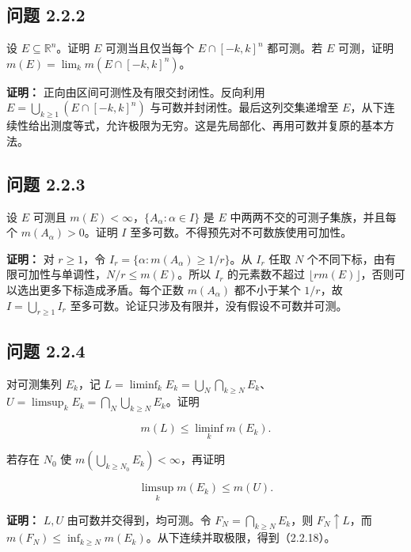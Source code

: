 \documentclass[11pt,a4paper]{article}
\begin{document}
\subsection{问题 2.2.2}\label{ux95eeux9898-2.2.2}

设 \(E\subseteq\mathbb R^n\)。证明 \(E\) 可测当且仅当每个
\(E\cap[-k,k]^n\) 都可测。若 \(E\) 可测，证明
\(m(E)=\lim_km(E\cap[-k,k]^n)\)。

\textbf{证明：} 正向由区间可测性及有限交封闭性。反向利用
\(E=\bigcup_{k\ge1}(E\cap[-k,k]^n)\) 与可数并封闭性。最后这列交集递增至
\(E\)，从下连续性给出测度等式，允许极限为无穷。这是先局部化、再用可数并复原的基本方法。

\subsection{问题 2.2.3}\label{ux95eeux9898-2.2.3}

设 \(E\) 可测且 \(m(E)<\infty\)，\(\{A_\alpha:\alpha\in I\}\) 是 \(E\)
中两两不交的可测子集族，并且每个 \(m(A_\alpha)>0\)。证明 \(I\)
至多可数。不得预先对不可数族使用可加性。

\textbf{证明：} 对 \(r\ge1\)，令
\(I_r=\{\alpha:m(A_\alpha)\ge1/r\}\)。从 \(I_r\) 任取 \(N\)
个不同下标，由有限可加性与单调性，\(N/r\le m(E)\)。所以 \(I_r\)
的元素数不超过
\(\lfloor r m(E)\rfloor\)，否则可以选出更多下标造成矛盾。每个正数
\(m(A_\alpha)\) 都不小于某个 \(1/r\)，故 \(I=\bigcup_{r\ge1}I_r\)
至多可数。论证只涉及有限并，没有假设不可数并可测。

\subsection{问题 2.2.4}\label{ux95eeux9898-2.2.4}

对可测集列 \(E_k\)，记 \(L=\liminf_kE_k=\bigcup_N\bigcap_{k\ge N}E_k\)、
\(U=\limsup_kE_k=\bigcap_N\bigcup_{k\ge N}E_k\)。证明

\begin{equation*}
m(L)\le\liminf_km(E_k).
\tag{2.2.18}
\end{equation*}

若存在 \(N_0\) 使 \(m(\bigcup_{k\ge N_0}E_k)<\infty\)，再证明

\begin{equation*}
\limsup_km(E_k)\le m(U).
\tag{2.2.19}
\end{equation*}

\textbf{证明：} \(L,U\) 由可数并交得到，均可测。令
\(F_N=\bigcap_{k\ge N}E_k\)，则 \(F_N\uparrow L\)，而
\(m(F_N)\le\inf_{k\ge N}m(E_k)\)。从下连续并取极限，得到（2.2.18）。
\end{document}

